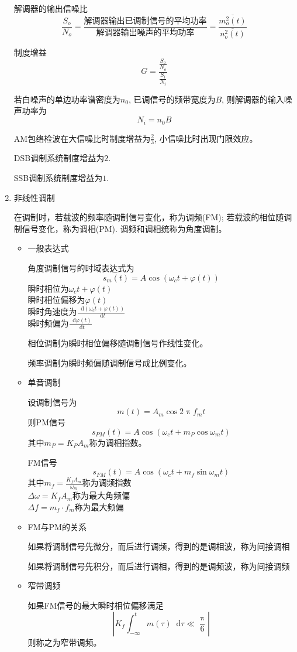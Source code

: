 \documentclass[UTF8]{ctexrep}
\renewcommand{\phi}{\varphi}
\newcommand{\ext}{\displaystyle}
\newcommand{\dif}{\mathop{}\!{}\mathrm{d}}
\def\pth#1{\left( {#1}\right)}
\begin{document}
\begin{enumerate}
解调器的输出信噪比
\[\frac{S_o}{N_o}=\frac{\text{解调器输出已调制信号的平均功率}}{\text{解调器输出噪声的平均功率}}=\frac{\overline{m_o^2(t)}}{\overline{n_o^2(t)}}\]

制度增益
\[G=\frac{\frac{S_o}{N_o}}{\frac{S_i}{N_i}}\]

若白噪声的单边功率谱密度为$n_0$, 已调信号的频带宽度为$B$, 则解调器的输入噪声功率为
\[N_i=n_0B\]

AM包络检波在大信噪比时制度增益为$\ext\frac{2}{3}$, 小信噪比时出现门限效应。\par
DSB调制系统制度增益为$2$.\par
SSB调制系统制度增益为$1$.
\item 非线性调制\par
在调制时，若载波的频率随调制信号变化，称为调频(FM); 若载波的相位随调制信号变化，称为调相(PM). 调频和调相统称为角度调制。
\begin{itemize}
\item 一般表达式\par
角度调制信号的时域表达式为
\[s_m(t)=A\cos\pth{\omega_ct+\phi(t)}\]
瞬时相位为$\omega_ct+\phi(t)$\\
瞬时相位偏移为$\phi(t)$\\
瞬时角速度为$\ext\frac{\dif \pth{\omega_ct+\phi(t)}}{\dif t}$\\
瞬时频偏为$\ext\frac{\dif \phi(t)}{\dif t}$\par
相位调制为瞬时相位偏移随调制信号作线性变化。\par
频率调制为瞬时频偏随调制信号成比例变化。
\item 单音调制\par
设调制信号为
\[m(t)=A_m\cos 2\uppi f_mt\]
则PM信号
\[s_{PM}(t)=A\cos\pth{\omega_c t+m_P\cos\omega_m t}\]
其中$m_P=K_PA_m$称为调相指数。\par
FM信号
\[s_{FM}(t)=A\cos\pth{\omega_c t+m_f\sin\omega_m t}\]
其中$\ext m_f=\frac{K_fA_m}{\omega_m}$称为调频指数\\
$\Delta\omega =K_fA_m$称为最大角频偏\\
$\Delta f=m_f\cdot f_m$称为最大频偏
\item FM与PM的关系\par
如果将调制信号先微分，而后进行调频，得到的是调相波，称为间接调相\par
如果将调制信号先积分，而后进行调相，得到的是调频波，称为间接调频
\item 窄带调频\par
如果FM信号的最大瞬时相位偏移满足
\[\left| K_f\int_{-\infty}^tm\pth{\tau}\dif\tau\ll\frac{\uppi}{6}\right|\]
则称之为窄带调频。\par

\end{itemize}
\end{enumerate}
\end{document}
